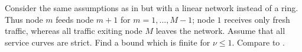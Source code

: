 \begin{problem}
Consider the same assumptions as in  but
with a linear network instead of a ring. Thus node $m$ feeds node
$m+1$ for $m=1,..., M-1$; node $1$ receives only fresh traffic,
whereas all traffic exiting node $M$ leaves the network. Assume
that all service curves are strict. Find a bound which is finite
for $\nu \leq 1$. Compare to . 
\end{problem}

